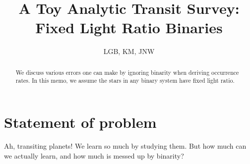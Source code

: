 \documentclass{emulateapj}
\begin{document}
%
\def\ltsima{$\; \buildrel < \over \sim \;$}
\def\lsim{\lower.5ex\hbox{\ltsima}}
\def\gtsima{$\; \buildrel > \over \sim \;$}
\def\gsim{\lower.5ex\hbox{\gtsima}}
\def\tess{{\it TESS} }
\def \teff {T_{\rm eff}}
\def \phir {\Phi_{\rm R}}
\def \fov {24$^{\circ}$}
\def \pixsz {21.1''}
\def \aeff {69.1 cm$^2$ }    
\def \epd {105 mm}                          
                                                                                          
%



\title{ A Toy Analytic Transit Survey: Fixed Light Ratio Binaries }

\author{
  LGB, KM, JNW
}



\begin{abstract}

We discuss various errors one can make by ignoring binarity when deriving 
occurrence rates.
In this memo, we assume the stars in any binary system have fixed light ratio.

\end{abstract}


\section*{Statement of problem}

Ah, transiting planets! We learn so much by studying them. But how much can we 
actually learn, and how much is messed up by binarity?
\end{document}
